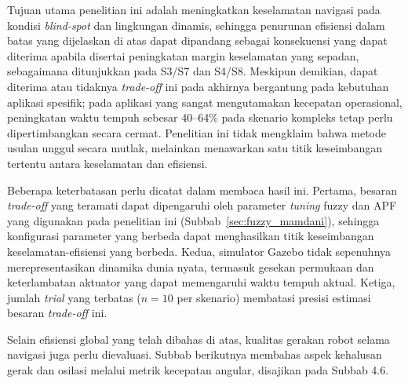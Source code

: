 Tujuan utama penelitian ini adalah meningkatkan keselamatan navigasi pada
kondisi \textit{blind-spot} dan lingkungan dinamis, sehingga penurunan
efisiensi dalam batas yang dijelaskan di atas dapat dipandang sebagai
konsekuensi yang dapat diterima apabila disertai peningkatan margin
keselamatan yang sepadan, sebagaimana ditunjukkan pada S3/S7 dan S4/S8.
Meskipun demikian, dapat diterima atau tidaknya \textit{trade-off} ini pada
akhirnya bergantung pada kebutuhan aplikasi spesifik; pada aplikasi yang
sangat mengutamakan kecepatan operasional, peningkatan waktu tempuh sebesar
40--64\% pada skenario kompleks tetap perlu dipertimbangkan secara cermat.
Penelitian ini tidak mengklaim bahwa metode usulan unggul secara mutlak,
melainkan menawarkan satu titik keseimbangan tertentu antara keselamatan
dan efisiensi.

Beberapa keterbatasan perlu dicatat dalam membaca hasil ini. Pertama,
besaran \textit{trade-off} yang teramati dapat dipengaruhi oleh parameter
\textit{tuning} fuzzy dan APF yang digunakan pada penelitian ini
(Subbab~\ref{sec:fuzzy_mamdani}), sehingga konfigurasi parameter yang
berbeda dapat menghasilkan titik keseimbangan keselamatan-efisiensi yang
berbeda. Kedua, simulator Gazebo tidak sepenuhnya merepresentasikan
dinamika dunia nyata, termasuk gesekan permukaan dan keterlambatan aktuator
yang dapat memengaruhi waktu tempuh aktual. Ketiga, jumlah \textit{trial}
yang terbatas ($n=10$ per skenario) membatasi presisi estimasi besaran
\textit{trade-off} ini.

Selain efisiensi global yang telah dibahas di atas, kualitas gerakan robot
selama navigasi juga perlu dievaluasi. Subbab berikutnya membahas aspek
kehalusan gerak dan osilasi melalui metrik kecepatan angular, disajikan
pada Subbab 4.6.